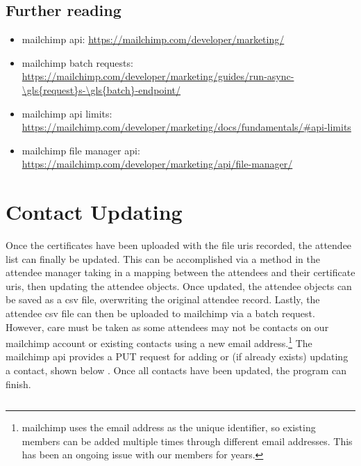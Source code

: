 \documentclass[11pt]{article}
\begin{document}
\subsection{Further reading}

\begin{itemize}
    \item \Gls{mailchimp} \acrshort{api}: \url{https://mailchimp.com/developer/marketing/}
    \item \Gls{mailchimp} \gls{batch} \gls{request}s: \url{https://mailchimp.com/developer/marketing/guides/run-async-\gls{request}s-\gls{batch}-endpoint/}
    \item \Gls{mailchimp} \acrshort{api} limits: \url{https://mailchimp.com/developer/marketing/docs/fundamentals/#api-limits}
    \item \Gls{mailchimp} file manager \acrshort{api}: \url{https://mailchimp.com/developer/marketing/api/file-manager/}
\end{itemize}

\newpage

\section{Contact Updating}

Once the certificates have been uploaded with the file \acrshort{uri}s recorded, the attendee list can finally be updated. This can be accomplished via a method in the attendee manager taking in a mapping between the attendees and their certificate \acrshort{uri}s, then updating the attendee \glspl{object}. Once updated, the attendee \glspl{object} can be saved as a \acrshort{csv} file, overwriting the original attendee record. Lastly, the attendee \acrshort{csv} file can then be uploaded to \Gls{mailchimp} via a \gls{batch} \gls{request}. However, care must be taken as some attendees may not be contacts on our \Gls{mailchimp} account or existing contacts using a new email address.\footnote{\Gls{mailchimp} uses the email address as the unique identifier, so existing members can be added multiple times through different email addresses. This has been an ongoing issue with our members for years.} The \Gls{mailchimp} \acrshort{api} provides a PUT \gls{request} for adding or (if already exists) updating a contact, shown below \cite{mailchimp-update-member}. Once all contacts have been updated, the program can finish.

\inputminted[linenos=true]{python}{mailchimp_examples/add_or_update_member.py}
\end{document}
